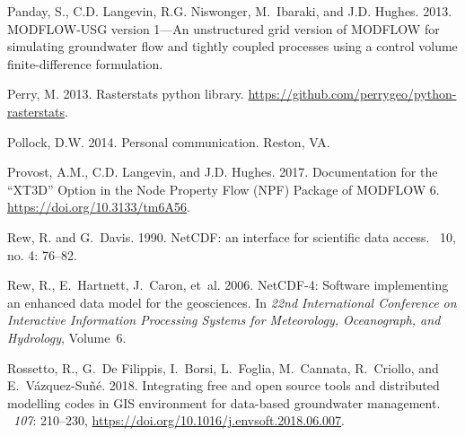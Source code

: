 \documentclass[12pt, oneside]{article}  	%
\begin{document}
\begin{thebibliography}{}
Panday, S., C.D. Langevin, R.G. Niswonger, M.~Ibaraki, and J.D. Hughes. 2013.
\newblock MODFLOW-USG version 1---An unstructured grid version of MODFLOW for
  simulating groundwater flow and tightly coupled processes using a control
  volume finite-difference formulation.

Perry, M. 2013.
\newblock Rasterstats python library.
\newblock \url{https://github.com/perrygeo/python-rasterstats}.

Pollock, D.W. 2014.
\newblock Personal communication.
\newblock Reston, VA.

Provost, A.M., C.D. Langevin, and J.D. Hughes. 2017.
\newblock Documentation for the ``XT3D'' Option in the Node Property Flow (NPF)
  Package of MODFLOW 6.
 \url{https://doi.org/10.3133/tm6A56}.

Rew, R. and G.~Davis. 1990.
\newblock NetCDF: an interface for scientific data access.
~10, no. 4: 76--82.

Rew, R., E.~Hartnett, J.~Caron, et~al. 2006.
\newblock NetCDF-4: Software implementing an enhanced data model for the
  geosciences.
\newblock In {\em 22nd International Conference on Interactive Information
  Processing Systems for Meteorology, Oceanograph, and Hydrology}, Volume~6.

Rossetto, R., G.~{De Filippis}, I.~Borsi, L.~Foglia, M.~Cannata, R.~Criollo,
  and E.~V{\'a}zquez-Su{\~n}{\'e}. 2018.
\newblock Integrating free and open source tools and distributed modelling
  codes in {GIS} environment for data-based groundwater management.
~{\em 107}: 210--230,
  \url{https://doi.org/10.1016/j.envsoft.2018.06.007}.


\end{thebibliography}
\end{document}
